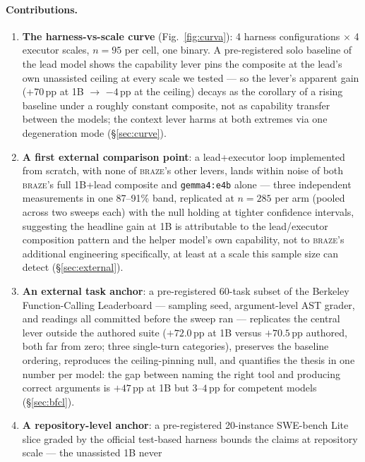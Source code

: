 \documentclass[smallcondensed,natbib]{svjour3}
\newcommand{\braze}{\textsc{braze}}
\begin{document}
\paragraph{Contributions.}
\begin{enumerate}
  \item \textbf{The harness-vs-scale curve} (Fig.~\ref{fig:curva}):
    4 harness configurations $\times$ 4 executor scales, $n{=}95$ per
    cell, one binary. A pre-registered solo baseline of the lead model
    shows the capability lever pins the composite at the lead's own
    unassisted ceiling at every scale we tested --- so the lever's
    apparent gain (+70\,pp at 1B $\to$ $-4$\,pp at the ceiling) decays
    as the corollary of a rising baseline under a roughly constant
    composite, not as capability transfer between the models; the
    context lever harms at both extremes via one degeneration mode
    (\S\ref{sec:curve}).
  \item \textbf{A first external comparison point}: a lead+executor
    loop implemented from scratch, with none of \braze{}'s other
    levers, lands within noise of both \braze{}'s full 1B+lead
    composite and \texttt{gemma4:e4b} alone --- three independent
    measurements in one 87--91\% band, replicated at $n{=}285$ per arm
    (pooled across two sweeps each) with the null holding at tighter
    confidence intervals, suggesting the
    headline gain at 1B is attributable to the lead/executor
    composition pattern and the helper model's own capability, not to
    \braze{}'s additional engineering specifically, at least at a scale
    this sample size can detect (\S\ref{sec:external}).
  \item \textbf{An external task anchor}: a pre-registered 60-task
    subset of the Berkeley Function-Calling Leaderboard
    \citep{bfcl} --- sampling seed, argument-level AST grader, and
    readings all committed before the sweep ran --- replicates the
    central lever outside the authored suite ($+72.0$\,pp at 1B
    versus $+70.5$\,pp authored, both far from zero; three single-turn
    categories), preserves the
    baseline ordering, reproduces the ceiling-pinning null, and
    quantifies the thesis in one number per model: the gap between
    naming the right tool and producing correct arguments is
    $+47$\,pp at 1B but $3$--$4$\,pp for competent models
    (\S\ref{sec:bfcl}).
  \item \textbf{A repository-level anchor}: a pre-registered 20-instance
    SWE-bench Lite slice graded by the official test-based harness
    bounds the claims at repository scale --- the unassisted 1B never

\end{enumerate}
\end{document}
